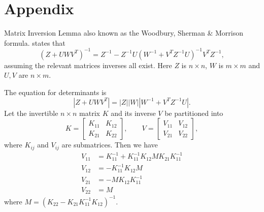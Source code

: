 \documentclass[11pt,a4paper]{article}
\theoremstyle{definition}
\numberwithin{equation}{section}
\begin{document}
\section*{Appendix}
Matrix Inversion Lemma also known as the Woodbury, Sherman \& Morrison formula\cite{press}. states that 
\begin{equation*}
(Z+UWV^T)^{-1} = Z^{-1}-Z^{-1}U(W^{-1}+V^TZ^{-1}U)^{-1}V^TZ^{-1},
\end{equation*}
assuming the relevant matrices inverses all exist. Here $Z$ is $n\times n$, $W$ is $m\times m$ and $U,V$ are $n\times m$.

The equation for determinants is
\begin{equation*}
|Z+UWV^T|=|Z||W||W^{-1}+V^TZ^{-1}U|.
\end{equation*}
Let the invertible $n\times n$ matrix $K$ and its inverse $V$ be partitioned into
\begin{equation*}
K = \begin{bmatrix}
K_{11}&K_{12}\\
K_{21}&K_{22}
\end{bmatrix},
\qquad
V = \begin{bmatrix}
V_{11}&V_{12}\\
V_{21}&V_{22}
\end{bmatrix},
\end{equation*}
where $K_{ij}$ and $V_{ij}$ are submatrices. Then we have
\begin{equation*}
\begin{split}
V_{11}&=K^{-1}_{11}+K^{-1}_{11}K_{12}MK_{21}K^{-1}_{11}\\
V_{12}& = -K^{-1}_{11}K_{12}M\\
V_{21}&=-MK_{12}K^{-1}_{11}\\
V_{22}&=M
\end{split}
\end{equation*}
where $M = (K_{22}-K_{21}K^{-1}_{11}K_{12})^{-1}$.
\end{document}
